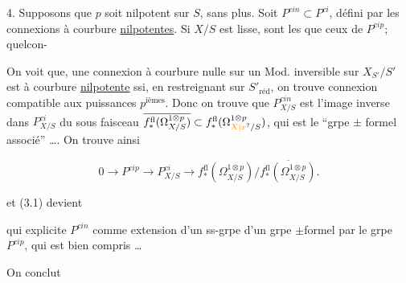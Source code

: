 4. Supposons que $p$ soit nilpotent sur $S$, sans plus. Soit $P^{cin}\subset P^{ci}$, défini par les connexions à courbure \uline{nilpotentes}. Si $X/S$ est lisse,   sont les  que  ceux de $P^{cip}$;  quelcon-



On voit que, une connexion à courbure nulle sur un Mod. inversible sur $X_{S'}/S'$ est à courbure \uline{nilpotente} ssi, en restreignant sur $S'_{\mathrm{réd}}$, on trouve connexion compatible aux puissances $p^{\text{ièmes}}$. Donc on trouve que $P^{cin}_{X/S}$ est l'image inverse dans $P^{ci}_{X/S}$ du sous faisceau $\overline{f_*^{\mathrm{fl}}(\Omega^{1\otimes p}_{X/S})}\subset f_*^{\mathrm{fl}}(\Omega^{1\otimes p}_{\unsure{X|x}/S})$, qui est le  ``grpe $\pm$ formel associé'' \ldots. On trouve ainsi

\[
0\longrightarrow P^{cip}\longrightarrow P^{ci}_{X/S}\longrightarrow f_*^{\mathrm{fl}}(\Omega^{1\otimes p}_{X/S})/\overline{f_*^{\mathrm{fl}}(\Omega^{1\otimes p}_{X/S})}.\tag*{(4.1)}
\]

 et (3.1) devient


qui explicite $P^{cin}$ comme extension d'un ss-grpe d'un grpe $\pm$formel par  le grpe $P^{cip}$, qui est bien compris \ldots


On conclut


